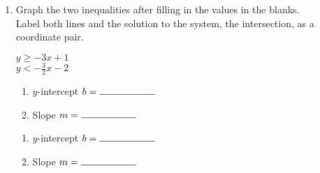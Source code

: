 \documentclass[12pt, twoside]{article}
\begin{document}
\begin{enumerate}
\begin{multicols}{2}
          Line: \hspace{1cm} Solid ($=$) \hspace{0.45cm} Dashed ($\neq$)\\[0.5cm]
          Shading: \hspace{0.3cm} Above ($y>$) \hspace{0.25cm} Below ($y<$)
        \end{multicols}

    \newpage
    \item Graph the two inequalities after filling in the values in the blanks.\\[0.5cm]
    Label both lines and the solution to the system, the intersection, as a coordinate pair.\\
      \begin{multicols}{2}
        $y \geq -3 x +1$ \\
        $y < -\frac{3}{2} x -2$
      \end{multicols}
      \begin{multicols}{2}
        \raggedcolumns
        \begin{enumerate}
          \item $y$-intercept $b= \rule{2cm}{0.15mm}$ \\[0.5cm]
          \item Slope \hspace{0.7cm} $m= \rule{2cm}{0.15mm}$\\[0.5cm]
        \end{enumerate}
        \begin{enumerate}
          \item $y$-intercept $b= \rule{2cm}{0.15mm}$ \\[0.5cm]
          \item Slope \hspace{0.7cm} $m= \rule{2cm}{0.15mm}$\\[0.5cm]
        \end{enumerate}
      \end{multicols}

      \begin{center} %
      \end{center}


\end{enumerate}
\end{document}
